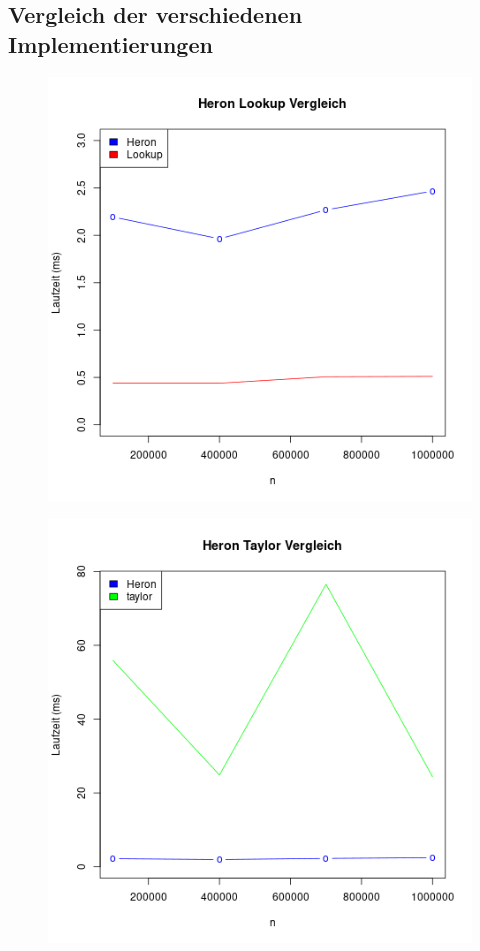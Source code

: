 \documentclass[course=erap]{aspdoc}
\begin{document}
\subsection{Vergleich der verschiedenen Implementierungen}
\begin{figure}[H]
    \centering
    \begin{minipage}{.4\textwidth}
        \centering
        \includegraphics[width=.9\linewidth]{graphs/Heronlookup.png}
        \label{fig:test3}
    \end{minipage}%
    \begin{minipage}{.4\textwidth}
        \centering
        \includegraphics[width=.9\linewidth]{graphs/HeronTaylor.png}

\end{minipage}
\end{figure}
\end{document}
